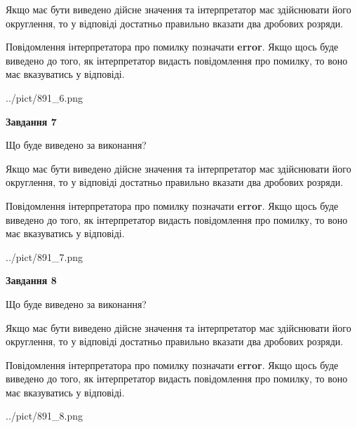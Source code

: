 \documentclass[12pt, ukrainian]{article}
\begin{document}
{\begin {Large}
Якщо має бути виведено дійсне значення та інтерпретатор має здійснювати його округлення, 
то у відповіді достатньо правильно вказати два дробових розряди.

Повідомлення інтерпретатора про помилку позначати \textbf{error}.
Якщо щось буде виведено до того, як інтерпретатор видасть повідомлення про помилку, 
то воно має вказуватись у відповіді. \par

\begin{center}
	{../pict/891_6.png}
\end{center}
\newpage

{\begin {center}\textbf{Завдання 7}\end {center}}\par
Що буде виведено за виконання? \par

Якщо має бути виведено дійсне значення та інтерпретатор має здійснювати його округлення, 
то у відповіді достатньо правильно вказати два дробових розряди.

Повідомлення інтерпретатора про помилку позначати \textbf{error}.
Якщо щось буде виведено до того, як інтерпретатор видасть повідомлення про помилку, 
то воно має вказуватись у відповіді. \par

\begin{center}
	{../pict/891_7.png}
\end{center}
\newpage

{\begin {center}\textbf{Завдання 8}\end {center}}\par
Що буде виведено за виконання? \par

Якщо має бути виведено дійсне значення та інтерпретатор має здійснювати його округлення, 
то у відповіді достатньо правильно вказати два дробових розряди.

Повідомлення інтерпретатора про помилку позначати \textbf{error}.
Якщо щось буде виведено до того, як інтерпретатор видасть повідомлення про помилку, 
то воно має вказуватись у відповіді. \par

\begin{center}
	{../pict/891_8.png}
\end{center}
\newpage


\end{Large}}
\end{document}
